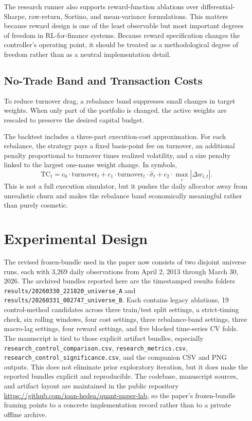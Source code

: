 \documentclass[10pt,twocolumn]{article}
\begin{document}
The research runner also supports reward-function ablations over
differential-Sharpe, raw-return, Sortino, and mean-variance formulations. This
matters because reward design is one of the least observable but most important
degrees of freedom in RL-for-finance systems. Because reward specification
changes the controller's operating point, it should be treated as a
methodological degree of freedom rather than as a neutral implementation detail.

\subsection{No-Trade Band and Transaction Costs}

To reduce turnover drag, a rebalance band suppresses small changes in target
weights. When only part of the portfolio is changed, the active weights are
rescaled to preserve the desired capital budget.

The backtest includes a three-part execution-cost approximation. For each
rebalance, the strategy pays a fixed basis-point fee on turnover, an additional
penalty proportional to turnover times realized volatility, and a size penalty
linked to the largest one-name weight change. In symbols,
\[
\mathrm{TC}_t
= c_0 \cdot \mathrm{turnover}_t
+ c_1 \cdot \mathrm{turnover}_t \cdot \hat{\sigma}_t
+ c_2 \cdot \max_i |\Delta w_{i,t}|.
\]
This is not a full execution simulator, but it pushes the daily allocator away
from unrealistic churn and makes the rebalance band economically meaningful
rather than purely cosmetic.

\section{Experimental Design}

The revised frozen-bundle used in the paper now consists of two disjoint
universe runs, each with 3{,}269 daily observations from April 2, 2013 through
March 30, 2026. The archived bundles reported here are the timestamped results
folders \texttt{results/20260330\_221820\_universe\_A} and
\texttt{results/20260331\_002747\_universe\_B}. Each contains legacy
ablations, 19 control-method candidates across three train/test split
settings, a strict-timing check, six rolling windows, four cost settings,
three rebalance-band settings, three macro-lag settings, four reward settings,
and five blocked time-series CV folds. The manuscript is tied to those
explicit artifact bundles, especially \texttt{research\_control\_comparison.csv},
\texttt{research\_metrics.csv}, \texttt{research\_control\_significance.csv},
and the companion CSV and PNG outputs. This does not eliminate prior
exploratory iteration, but it does make the reported bundles explicit and
reproducible.
The codebase, manuscript sources, and artifact layout are maintained in the
public repository \url{https://github.com/ioan-hedea/quant-paper-lab}, so the
paper's frozen-bundle framing points to a concrete implementation record rather
than to a private offline archive.
\end{document}
